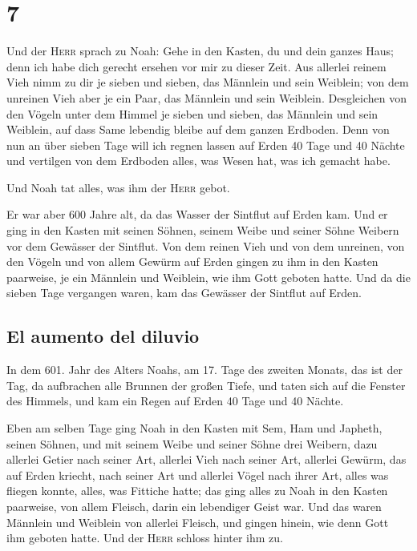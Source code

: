\hypertarget{section-6}{%
\section{7}\label{section-6}}

 Und der \textsc{Herr} sprach zu Noah: Gehe in den Kasten,
du und dein ganzes Haus; denn ich habe dich gerecht ersehen vor mir zu
dieser Zeit.  Aus allerlei reinem Vieh nimm zu dir je
sieben und sieben, das Männlein und sein Weiblein; von dem unreinen Vieh
aber je ein Paar, das Männlein und sein Weiblein. 
Desgleichen von den Vögeln unter dem Himmel je sieben und sieben, das
Männlein und sein Weiblein, auf dass Same lebendig bleibe auf dem ganzen
Erdboden.  Denn von nun an über sieben Tage will ich
regnen lassen auf Erden 40 Tage und 40 Nächte und vertilgen von dem
Erdboden alles, was Wesen hat, was ich gemacht habe.

 Und Noah tat alles, was ihm der \textsc{Herr} gebot.

 Er war aber 600 Jahre alt, da das Wasser der Sintflut auf
Erden kam.  Und er ging in den Kasten mit seinen Söhnen,
seinem Weibe und seiner Söhne Weibern vor dem Gewässer der Sintflut.
 Von dem reinen Vieh und von dem unreinen, von den Vögeln
und von allem Gewürm auf Erden  gingen zu ihm in den
Kasten paarweise, je ein Männlein und Weiblein, wie ihm Gott geboten
hatte.  Und da die sieben Tage vergangen waren, kam das
Gewässer der Sintflut auf Erden.

\hypertarget{el-aumento-del-diluvio}{%
\subsection{El aumento del diluvio}\label{el-aumento-del-diluvio}}

 In dem 601. Jahr des Alters Noahs, am 17. Tage des
zweiten Monats, das ist der Tag, da aufbrachen alle Brunnen der großen
Tiefe, und taten sich auf die Fenster des Himmels,  und
kam ein Regen auf Erden 40 Tage und 40 Nächte.

 Eben am selben Tage ging Noah in den Kasten mit Sem, Ham
und Japheth, seinen Söhnen, und mit seinem Weibe und seiner Söhne drei
Weibern,  dazu allerlei Getier nach seiner Art, allerlei
Vieh nach seiner Art, allerlei Gewürm, das auf Erden kriecht, nach
seiner Art und allerlei Vögel nach ihrer Art, alles was fliegen konnte,
alles, was Fittiche hatte;  das ging alles zu Noah in den
Kasten paarweise, von allem Fleisch, darin ein lebendiger Geist war.
 Und das waren Männlein und Weiblein von allerlei
Fleisch, und gingen hinein, wie denn Gott ihm geboten hatte. Und der
\textsc{Herr} schloss hinter ihm zu.

